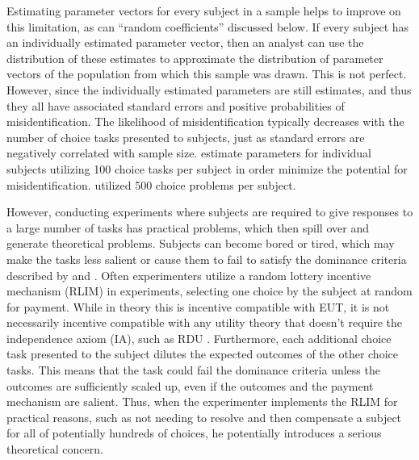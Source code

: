 \documentclass[../main.tex]{subfiles}
\begin{document}
Estimating parameter vectors for every subject in a sample helps to improve on this limitation, as can \enquote{random coefficients} discussed below.
If every subject has an individually estimated parameter vector, then an analyst can use the distribution of these estimates to approximate the distribution of parameter vectors of the population from which this sample was drawn.
This is not perfect.
However, since the individually estimated parameters are still estimates, and thus they all have associated standard errors and positive probabilities of misidentification.
The likelihood of misidentification typically decreases with the number of choice tasks presented to subjects, just as standard errors are negatively correlated with sample size.
\textcite{Hey1994} estimate parameters for individual subjects utilizing 100 choice tasks per subject in order minimize the potential for misidentification.
\textcite{Hey2001} utilized 500 choice problems per subject.

\addtocounter{footnote}{-1}

However, conducting experiments where subjects are required to give responses to a large number of tasks has practical problems, which then spill over and generate theoretical problems.
Subjects can become bored or tired, which may make the tasks less salient or cause them to fail to satisfy the dominance criteria described by \textcite{Smith1982} and \textcite{Harrison1992}.
Often experimenters utilize a random lottery incentive mechanism (RLIM) in experiments, selecting one choice by the subject at random for payment.
While in theory this is incentive compatible with EUT, it is not necessarily incentive compatible with any utility theory that doesn't require the independence axiom (IA), such as RDU \parencite{Harrison2014, Cox2015}.
Furthermore, each additional choice task presented to the subject dilutes the expected outcomes of the other choice tasks.
This means that the task could fail the dominance criteria unless the outcomes are sufficiently scaled up, even if the outcomes and the payment mechanism are salient.
Thus, when the experimenter implements the RLIM for practical reasons, such as not needing to resolve and then compensate a subject for all of potentially hundreds of choices, he potentially introduces a serious theoretical concern.
\end{document}
